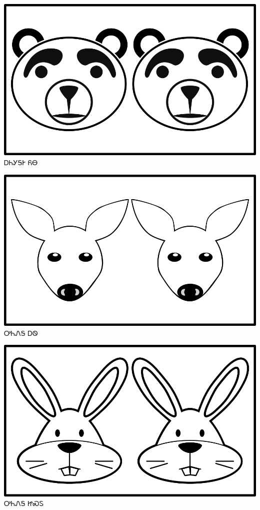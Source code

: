 \documentclass[avery5371]{flashcards}%
\begin{document}
    \begin{flashcard}{
        \includegraphics[width=0.95\columnwidth,height=.51\columnwidth,keepaspectratio]{../artwork/objects-animate/anitali-yona}
    }
        \Huge ᎠᏂᎩᎦᎨ ᏲᎾ
    \end{flashcard}

    \begin{flashcard}{
        \includegraphics[width=0.95\columnwidth,height=.51\columnwidth,keepaspectratio]{../artwork/objects-animate/anitali-ahwi}
    }
        \Huge ᎤᏂᏁᎦ ᎠᏫ
    \end{flashcard}

    \begin{flashcard}{
        \includegraphics[width=0.95\columnwidth,height=.51\columnwidth,keepaspectratio]{../artwork/objects-animate/anitali-jisdu}
    }
        \Huge ᎤᏂᏁᎦ ᏥᏍᏚ
    \end{flashcard}
\end{document}
